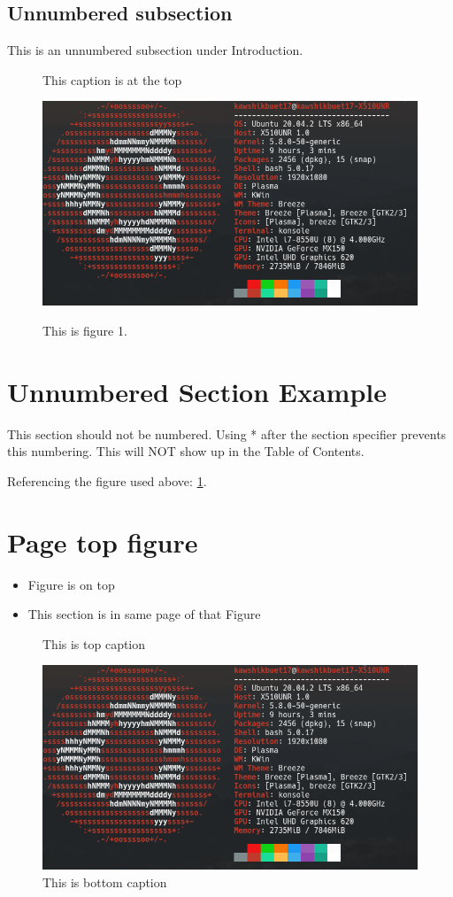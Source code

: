 \documentclass[14pt, a4paper]{article} %
\begin{document}
\pagebreak 

\subsection*{Unnumbered subsection}
This is an unnumbered subsection under Introduction. 
\begin{figure}[h]
	\centering
	\caption{This caption is at the top}
	\includegraphics[scale=0.15]{figure1.jpg}
	\label{fig:1}
	\caption{This is figure 1.}
\end{figure}


\section*{Unnumbered Section Example}
This section should not be numbered. Using * after the section specifier prevents this numbering. This will NOT show up in the Table of Contents. 

Referencing the figure used above: \ref{fig:1}.

\pagebreak
\section{Page top figure}
\begin{itemize}
 \item Figure is on top
 \item This section is in same page of that Figure
\end{itemize}

\begin{figure}[t]
    \centering
    \caption{This is top caption}
    \includegraphics[scale=0.2]{figure1.jpg}
    \caption{This is bottom caption}
\end{figure}
\end{document}
